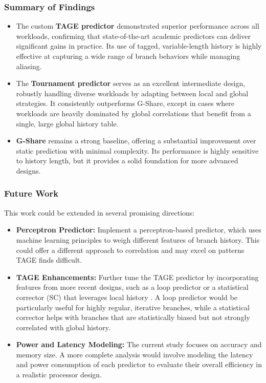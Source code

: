 \documentclass[sigconf, screen]{acmart}
\begin{document}
\subsubsection{Summary of Findings}
\begin{itemize}
    \item The custom \textbf{TAGE predictor} demonstrated superior performance across all workloads, confirming that state-of-the-art academic predictors can deliver significant gains in practice. Its use of tagged, variable-length history is highly effective at capturing a wide range of branch behaviors while managing aliasing.
    \item The \textbf{Tournament predictor} serves as an excellent intermediate design, robustly handling diverse workloads by adapting between local and global strategies. It consistently outperforms G-Share, except in cases where workloads are heavily dominated by global correlations that benefit from a single, large global history table.
    \item \textbf{G-Share} remains a strong baseline, offering a substantial improvement over static prediction with minimal complexity. Its performance is highly sensitive to history length, but it provides a solid foundation for more advanced designs.
\end{itemize}

\subsubsection{Future Work}
This work could be extended in several promising directions:
\begin{itemize}
    \item \textbf{Perceptron Predictor:} Implement a perceptron-based predictor, which uses machine learning principles to weigh different features of branch history. This could offer a different approach to correlation and may excel on patterns TAGE finds difficult.
    \item \textbf{TAGE Enhancements:} Further tune the TAGE predictor by incorporating features from more recent designs, such as a loop predictor \cite{seznec2007tage} or a statistical corrector (SC) that leverages local history \cite{seznec2011}. A loop predictor would be particularly useful for highly regular, iterative branches, while a statistical corrector helps with branches that are statistically biased but not strongly correlated with global history.
    \item \textbf{Power and Latency Modeling:} The current study focuses on accuracy and memory size. A more complete analysis would involve modeling the latency and power consumption of each predictor to evaluate their overall efficiency in a realistic processor design.
\end{itemize}
\end{document}

